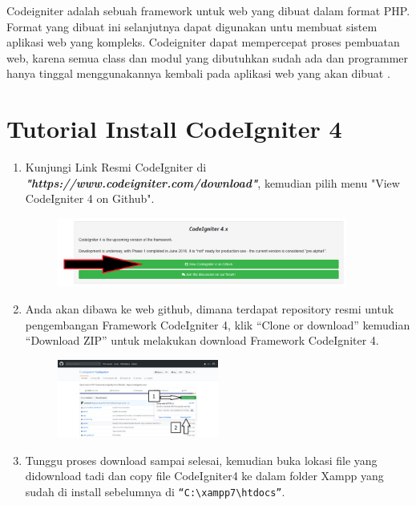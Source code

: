Codeigniter adalah sebuah framework untuk web yang dibuat dalam format PHP. Format yang dibuat ini selanjutnya dapat digunakan untu membuat sistem aplikasi web yang kompleks. Codeigniter dapat mempercepat proses pembuatan web, karena semua class dan modul yang dibutuhkan sudah ada dan programmer hanya tinggal menggunakannya kembali pada aplikasi web yang akan dibuat \cite{prabowo2015website}.

\section{Tutorial Install CodeIgniter 4}
\label{carainstallci4}
    \begin{enumerate}
        \item Kunjungi Link Resmi CodeIgniter di \textbf{\textit{"https://www.codeigniter.com/download"}}, kemudian pilih menu "View CodeIgniter 4 on Github".
		\begin{figure}[!htbp]
    		\centering
    		\includegraphics[width=0.9\textwidth]{figures/CODEIGNITER4/CI1_1.png}
    		\label{CodeIgniter1}
		\end{figure}
		
		\item Anda akan dibawa ke web github, dimana terdapat repository resmi untuk pengembangan Framework CodeIgniter 4, klik “Clone or download” kemudian “Download ZIP” untuk melakukan download Framework CodeIgniter 4.
		\begin{figure}[!htbp]
    		\centering
    		\includegraphics[width=0.5\textwidth]{figures/CODEIGNITER4/CI2.png}
    		\label{CodeIgniter2}
		\end{figure}
		
		\item Tunggu proses download sampai selesai, kemudian buka lokasi file yang didownload tadi dan copy file CodeIgniter4 ke dalam folder Xampp yang sudah di install sebelumnya di \verb|“C:\xampp7\htdocs”|.
		

\end{enumerate}
